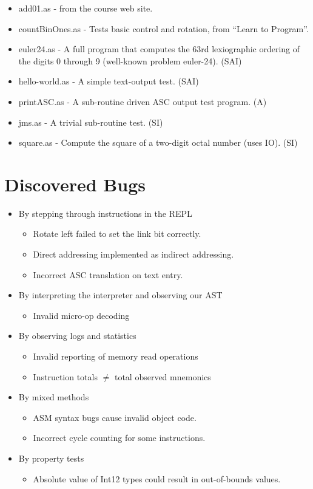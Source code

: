 \documentclass[11pt]{exam}
\begin{document}
\begin{itemize}
\item add01.as - from the course web site.
\item countBinOnes.as - Tests basic control and rotation, from ``Learn to Program''.
\item euler24.as - A full program that computes the 63rd lexiographic ordering of
  the digits 0 through 9 (well-known problem euler-24). (SAI)
\item hello-world.as - A simple text-output test. (SAI)
\item printASC.as - A sub-routine driven ASC output test program.  (A)
\item jms.as - A trivial sub-routine test. (SI)
\item square.as - Compute the square of a two-digit octal number (uses IO).  (SI)
\end{itemize}

\section{Discovered Bugs}
\begin{itemize}
\item By stepping through instructions in the REPL
 \begin{itemize}
 \item Rotate left failed to set the link bit correctly.
 \item Direct addressing implemented as indirect addressing.
 \item Incorrect ASC translation on text entry.
 \end{itemize}

\item By interpreting the interpreter and observing our AST
 \begin{itemize}
 \item Invalid micro-op decoding
 \end{itemize}

\item By observing logs and statistics
 \begin{itemize}
 \item Invalid reporting of memory read operations
 \item Instruction totals $\neq$ total observed mnemonics
 \end{itemize}

\item By mixed methods
 \begin{itemize}
 \item ASM syntax bugs cause invalid object code.
 \item Incorrect cycle counting for some instructions.
 \end{itemize}

\item By property tests
 \begin{itemize}
 \item Absolute value of Int12 types could result in out-of-bounds values.
 \end{itemize}
\end{itemize}
\end{document}
